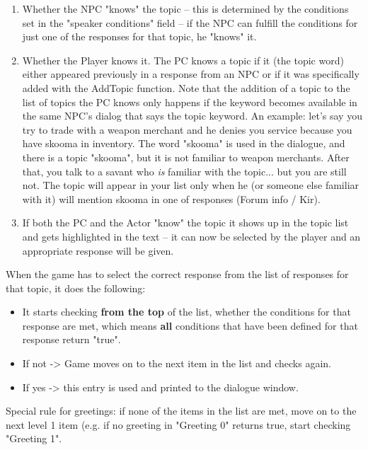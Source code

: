 \begin{enumerate}
\def\labelenumi{\arabic{enumi}.}
\item
  Whether the NPC "knows" the topic -- this is determined by the
  conditions set in the "speaker conditions" field -- if the NPC can
  fulfill the conditions for just one of the responses for that topic,
  he "knows" it.
\item
  Whether the Player knows it. The PC knows a topic if it (the topic
  word) either appeared previously in a response from an NPC or if it
  was specifically added with the AddTopic function. Note that the
  addition of a topic to the list of topics the PC knows only happens if
  the keyword becomes available in the same NPC's dialog that says the
  topic keyword. An example: let's say you try to trade with a weapon
  merchant and he denies you service because you have skooma in
  inventory. The word "skooma" is used in the dialogue, and there is a
  topic "skooma", but it is not familiar to weapon merchants. After
  that, you talk to a savant who \emph{is} familiar with the topic...
  but you are still not. The topic will appear in your list only when he
  (or someone else familiar with it) will mention skooma in one of
  responses (Forum info / Kir).
\item
  If both the PC and the Actor "know" the topic it shows up in the topic
  list and gets highlighted in the text -- it can now be selected by the
  player and an appropriate response will be given.
\end{enumerate}

When the game has to select the correct response from the list of
responses for that topic, it does the following:

\begin{itemize}
\item
  It starts checking \textbf{from the top} of the list, whether the
  conditions for that response are met, which means \textbf{all}
  conditions that have been defined for that response return "true".
\item
  If not -> Game moves on to the next item in the list and
  checks again.
\item
  If yes -> this entry is used and printed to the dialogue
  window.
\end{itemize}

Special rule for greetings: if none of the items in the list are met,
move on to the next level 1 item (e.g. if no greeting in "Greeting 0"
returns true, start checking "Greeting 1".


